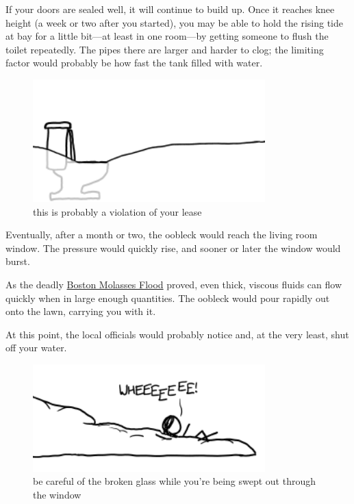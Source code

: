 {If your doors are sealed well, it will continue to build up. Once it reaches knee height (a week or two after you started), you may be able to hold the rising tide at bay for a little bit—at least in one room—by getting someone to flush the toilet repeatedly. The pipes there are larger and harder to clog; the limiting factor would probably be how fast the tank filled with water.}

\begin{figure}[!htbp]
\centering
\includegraphics[scale=0.5, max width=0.8\textwidth]{imgs/a/36/cornstarch_toilet.png}
\caption{this is probably a violation of your lease}
\end{figure}

{Eventually, after a month or two, the oobleck would reach the living room window. The pressure would quickly rise, and sooner or later the window would burst.}

{As the deadly \href{http://en.wikipedia.org/wiki/Boston\_Molasses\_Disaster}{Boston Molasses Flood} proved, even thick, viscous fluids can flow quickly when in large enough quantities. The oobleck would pour rapidly out onto the lawn, carrying you with it.}

{At this point, the local officials would probably notice and, at the very least, shut off your water.}

\begin{figure}[!htbp]
\centering
\includegraphics[scale=0.5, max width=0.8\textwidth]{imgs/a/36/cornstarch_lawn.png}
\caption{be careful of the broken glass while you're being swept out through the window}
\end{figure}

